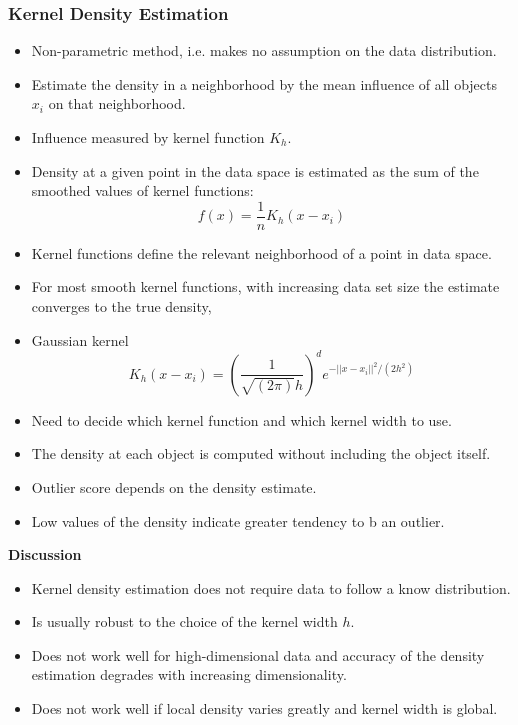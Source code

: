 \documentclass[../notes.tex]{subfiles}
\begin{document}
\subsubsection{Kernel Density Estimation}
\begin{itemize}
  \item Non-parametric method, i.e. makes no assumption on the data distribution.
  \item Estimate the density in a neighborhood by the mean influence of all objects $x_i$ on that neighborhood.
  \item Influence measured by kernel function $K_h$.
  \item Density at a given point in the data space is estimated as the sum of the smoothed values of kernel functions:
  $$f(x) = \frac{1}{n} K_h(x-x_i)$$
  \item Kernel functions define the relevant neighborhood of a point in data space.
  \item For most smooth kernel functions, with increasing data set size the estimate converges to the true density,
  \item Gaussian kernel 
  $$K_h(x-x_i) = (\frac{1}{\sqrt{(2\pi)}h})^d e^{-||x-x_i||^2/(2h^2)}$$
  \item Need to decide which kernel function and which kernel width to use.
  \item The density at each object is computed without including the object itself.
  \item Outlier score depends on the density estimate.
  \item Low values of the density indicate greater tendency to b an outlier.
\end{itemize}

\textbf{Discussion}
\begin{itemize}
  \item Kernel density estimation does not require data to follow a know distribution.
  \item Is usually robust to the choice of the kernel width $h$.
  \item Does not work well for high-dimensional data and accuracy of the density estimation degrades with increasing dimensionality.
  \item Does not work well if local density varies greatly and kernel width is global.
\end{itemize}
\end{document}
